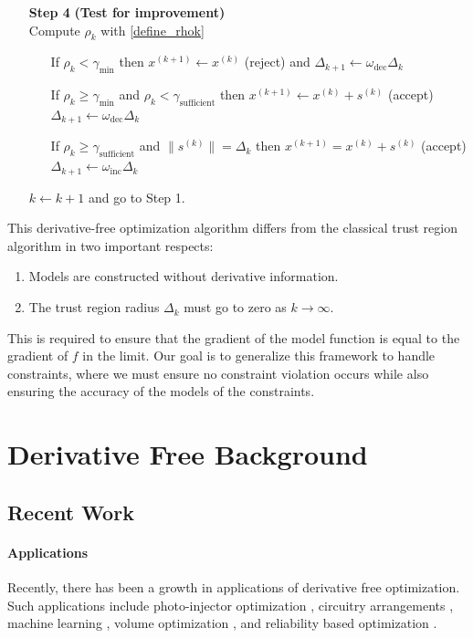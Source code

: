 \documentclass{article}
\theoremstyle{case}
\numberwithin{theorem}{subsection}
\newcommand{\gammabi}{\gamma_{\textrm{sufficient}}}
\newcommand{\gammasm}{\gamma_{\textrm{min}}}
\newcommand{\mfk}{{{m}_f}^{(k)}}
\newcommand{\omegadec}{\omega_{\text{dec}}}
\newcommand{\omegainc}{\omega_{\text{inc}}}
\newcommand{\rk}{\rho_k}
\newcommand{\sk}{{{s}^{(k)}}}
\newcommand{\xkpo}{{{x}^{(k+1)}}}
\newcommand{\xk}{{x^{(k)}}}
\begin{document}
\begin{algorithm}[H]
\begin{itemize}
        \item[\textbf{Step 4}] \textbf{(Test for improvement)} \\
            Compute $\rk$ with \cref{define_rhok} \begin{itemize}
                \item[] If $\rk < \gammasm$ then $\xkpo \gets \xk$ (reject) and $\Delta_{k+1} \gets \omegadec\Delta_{k}$
                \item[] If $\rk \ge \gammasm$ and $\rk < \gammabi$ then $\xkpo\gets\xk+\sk$ (accept) $\Delta_{k+1} \gets \omegadec\Delta_{k}$
                \item[] If $\rk \ge \gammabi$ and $\|\sk\| = \Delta_{k}$ then $\xkpo=\xk+\sk$ (accept) $\Delta_{k+1} \gets \omegainc\Delta_{k}$
            \end{itemize}
            $k \gets k+1$ and go to Step 1.
    \end{itemize}
\end{algorithm}

This derivative-free optimization algorithm differs from the classical trust region algorithm in two important respects:
\begin{enumerate}
    \item Models are constructed without derivative information.
    \item The trust region radius $\Delta_k$ must go to zero as $k\to\infty$.
\end{enumerate}

This is required to ensure that the gradient of the model function is equal to the gradient of $f$ in the limit.
Our goal is to generalize this framework to handle constraints, where we must ensure no constraint violation occurs while also ensuring the accuracy of the models of the constraints.

\section{Derivative Free Background}
\subsection{Recent Work}
\paragraph{Applications}

Recently, there has been a growth in applications of derivative free optimization.
Such applications include photo-injector optimization \cite{1742-6596-874-1-012062}, circuitry arrangements \cite{PLOSKAS201816}, machine learning \cite{KS2018}, volume optimization \cite{Cheng2017}, and reliability based optimization \cite{Gao2017}.
\end{document}
